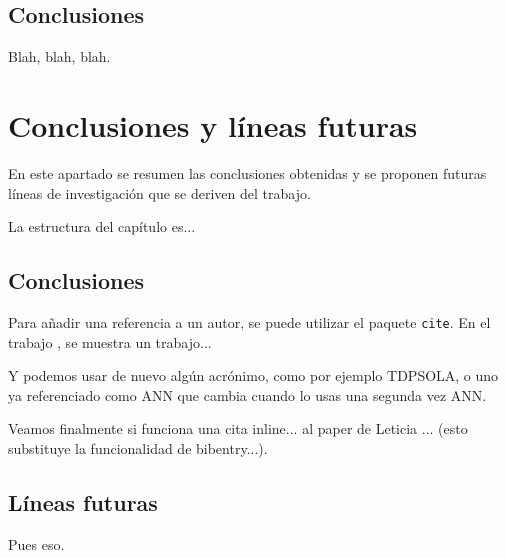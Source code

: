 \section{Conclusiones}
\label{sec:conclusiones-resultados}

Blah, blah, blah.




%
%
%
% 
%
%
%
%

\chapter{Conclusiones y líneas futuras}
\label{cha:concl-y-line}

En este apartado se resumen las conclusiones obtenidas y se proponen futuras líneas de investigación que se deriven del trabajo.

La estructura del capítulo es...


\section{Conclusiones}
\label{sec:conclusiones}

Para añadir una referencia a un autor, se puede utilizar el paquete \texttt{cite}. En el trabajo \cite{armani03}, se muestra un trabajo...

Y podemos usar de nuevo algún acrónimo, como por ejemplo \ac{TDPSOLA}, o uno ya referenciado como \ac{ANN} que cambia cuando lo usas una segunda vez \ac{ANN}.

Veamos finalmente si funciona una cita inline... al paper de Leticia ... (esto substituye la funcionalidad de bibentry...).


\section{Líneas futuras}
\label{sec:lineas-futuras}

Pues eso.


